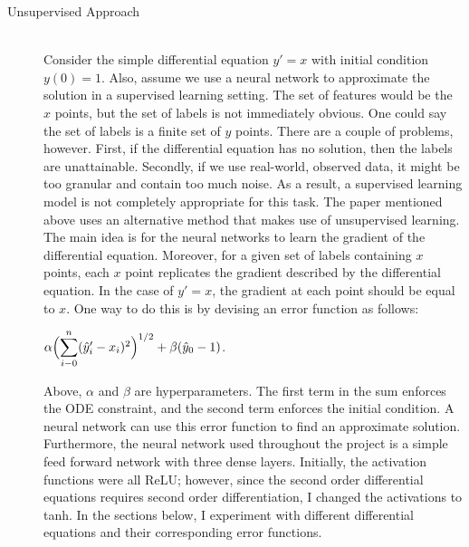 \documentclass[12pt]{article}
\newcommand{\dsum}[2]{\mathlarger{\sum}_{#1}^{#2}}
\newcommand{\bgc}{\begin{center}}
\newcommand{\enc}{\end{center}}
\begin{document}
\begin{description}
    \item[Unsupervised Approach] \hfill \\
    Consider the simple differential equation $y' = x$ with initial condition
    $y(0) = 1$. Also, assume we use a neural network to approximate the
    solution in a supervised learning setting. The set of features would be the
    $x$ points, but the set of labels is not immediately obvious. One could say
    the set of labels is a finite set of $y$ points. There are a couple of
    problems, however. First, if the differential equation has no solution,
    then the labels are unattainable. Secondly, if we use real-world, observed
    data, it might be too granular and contain too much noise. As a result, a
    supervised learning model is not completely appropriate for this task. The
    paper mentioned above uses an alternative method that makes use of
    unsupervised learning. The main idea is for the neural networks to learn
    the gradient of the differential equation. Moreover, for a given set of
    labels containing $x$ points, each $x$ point replicates the gradient
    described by the differential equation. In the case of $y' = x$, the
    gradient at each point should be equal to $x$. One way to do this is by
    devising an error function as follows: 
    \bgc 
    $\alpha\Bigl(\dsum{i-0}{n}(\hat{y}_i' - x_i)^2\Bigr)^{1/2} + \beta(\hat{y}_0 - 1)$.
    \enc
    Above, $\alpha$ and $\beta$ are hyperparameters. The first term in the sum
    enforces the ODE constraint, and the second term enforces the initial
    condition. A neural network can use this error function to find an
    approximate solution. Furthermore, the neural network used throughout the
    project is a simple feed forward network with three dense layers.
    Initially, the activation functions were all ReLU; however, since the
    second order differential equations requires second order differentiation,
    I changed the activations to tanh. In the sections below, I experiment with
    different differential equations and their corresponding error functions. 


\end{description}
\end{document}
